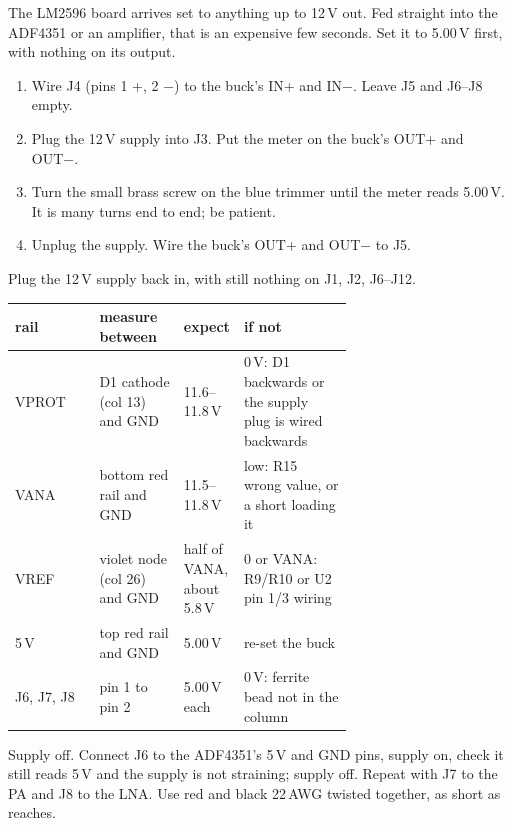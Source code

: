 \documentclass[10pt]{article}
\begin{document}
\begin{warn}
The LM2596 board arrives set to anything up to 12\,V out. Fed straight into the ADF4351 or an amplifier, that is an expensive few seconds. Set it to 5.00\,V first, with nothing on its output.
\end{warn}

\begin{enumerate}
  \item Wire J4 (pins 1 +, 2 −) to the buck's IN+ and IN−. Leave J5 and J6–J8 empty.
  \item Plug the 12\,V supply into J3. Put the meter on the buck's OUT+ and OUT−.
  \item Turn the small brass screw on the blue trimmer until the meter reads 5.00\,V. It is many turns end to end; be patient.
  \item Unplug the supply. Wire the buck's OUT+ and OUT− to J5.
\end{enumerate}

Plug the 12\,V supply back in, with still nothing on J1, J2, J6–J12.

{\small
\begin{tabularx}{\linewidth}{@{}P{0.25\linewidth}P{0.25\linewidth}P{0.17\linewidth}L@{}}
\toprule
\textbf{rail} & \textbf{measure between} & \textbf{expect} & \textbf{if not} \\ \midrule
VPROT & D1 cathode (col 13) and GND & 11.6–11.8\,V & 0\,V: D1 backwards or the supply plug is wired backwards \\
VANA & bottom red rail and GND & 11.5–11.8\,V & low: R15 wrong value, or a short loading it \\
VREF & violet node (col 26) and GND & half of VANA, about 5.8\,V & 0 or VANA: R9/R10 or U2 pin 1/3 wiring \\
5\,V & top red rail and GND & 5.00\,V & re-set the buck \\
J6, J7, J8 & pin 1 to pin 2 & 5.00\,V each & 0\,V: ferrite bead not in the column \\
\bottomrule
\end{tabularx}}

Supply off. Connect J6 to the ADF4351's 5\,V and GND pins, supply on, check it still reads 5\,V and the supply is not straining; supply off. Repeat with J7 to the PA and J8 to the LNA. Use red and black 22\,AWG twisted together, as short as reaches.
\end{document}
